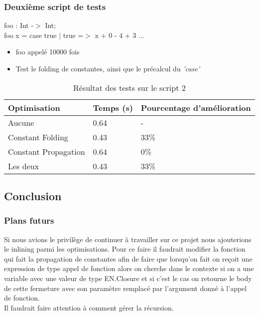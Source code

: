 \documentclass{beamer}
\begin{document}
\begin{frame}
    \frametitle{Deuxième script de tests}
    foo : Int -$>$ Int;\\
    foo x = case true
        $|$ true =$>$ x + 0 - 4 + 3 ...\\
    \bigskip
    \begin{itemize}
      \item foo appelé 10000 fois
      \item Test le folding de constantes, ainsi que le précalcul du \emph{'case'}
    \end{itemize}

    \begin{table}
      \begin{tabular}{l l l}
        \toprule
        \textbf{Optimisation} & \textbf{Temps (s)} & \textbf{Pourcentage d'amélioration}\\
        \midrule
        Aucune & 0.64 & - \\
        Constant Folding & 0.43 & 33\% \\
        Constant Propagation & 0.64 & 0\% \\
        Les deux & 0.43 & 33\% \\
        \bottomrule
      \end{tabular}
      \caption{Résultat des tests sur le script 2}
    \end{table}

\end{frame}
\subsection{Conclusion}
\begin{frame}
    \frametitle{Plans futurs}

    Si nous avions le privilège de continuer à travailler sur ce projet nous
    ajouterions le inlining parmi les optimisations. Pour ce faire il faudrait
    modifier la fonction qui fait la propagation de constantes afin de faire
    que lorsqu'on fait on reçoit une expression de type appel de fonction alors
    on cherche dans le contexte si on a une variable avec une valeur de type 
    EN.Closure et si c'est le cas on retourne le body de cette fermeture avec
    son paramètre remplacé par l'argument donné à l'appel de fonction.\\
    \bigskip
    Il faudrait faire attention à comment gérer la récursion.
\end{frame}
\end{document}
